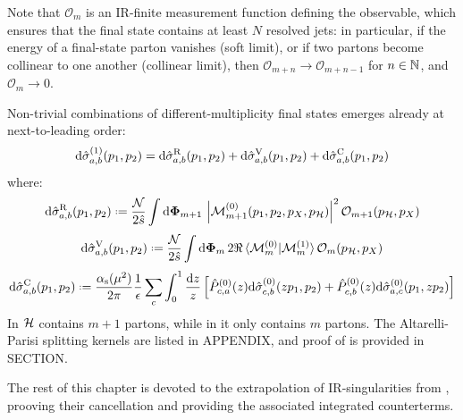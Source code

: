 Note that $ \mathcal{O}_m $ is an IR-finite measurement function defining the observable, which ensures that the final state contains at least $ N $ resolved jets: in particular, if the energy of a final-state parton vanishes (soft limit), or if two partons become collinear to one another (collinear limit), then $ \mathcal{O}_{m + n} \rightarrow \mathcal{O}_{m + n - 1} $ for $ n \in \mathbb{N} $, and $ \mathcal{O}_m \rightarrow 0 $.

Non-trivial combinations of different-multiplicity final states emerges already at next-to-leading order:
\begin{equation}
  \mathrm{d}\hat{\sigma}_{a,b}^{(1)}(p_1 , p_2) = \mathrm{d}\hat{\sigma}_{a,b}^\text{R}(p_1 , p_2) + \mathrm{d}\hat{\sigma}_{a,b}^\text{V}(p_1 , p_2) + \mathrm{d}\hat{\sigma}_{a,b}^\text{C}(p_1 , p_2)
\end{equation}
where:
\begin{equation}
  \dd\pcs_{a,b}^\text{R}(p_1 , p_2) \defeq \frac{\mathcal{N}}{2\hat{s}} \int \lps_{m+1} \, \abs{\mat^{(0)}_{m+1}(p_1, p_2, p_X, p_\fs)}^2 \mathcal{O}_{m+1}(p_\fs, p_X)
  \label{eq:real-cs}
\end{equation}
\begin{equation}
  \dd\pcs_{a,b}^\text{V}(p_1 , p_2) \defeq \frac{\mathcal{N}}{2\hat{s}} \int \lps_m \, 2\Re \braket{\mat_m^{(0)} | \mat_m^{(1)}} \mathcal{O}_m(p_\fs, p_X)
  \label{eq:virt-cs}
\end{equation}
\begin{equation}
  \dd\pcs_{a,b}^\text{C}(p_1 , p_2) \defeq \frac{\rcr}{2\pi} \frac{1}{\de} \sum_c \int_0^1 \frac{\dd z}{z} \left[ \hat{P}_{c,a}^{(0)}(z) \dd\pcs_{c,b}^{(0)}(z p_1 , p_2) + \hat{P}_{c,b}^{(0)}(z) \dd\pcs_{a,c}^{(0)}(p_1 , z p_2) \right]
  \label{eq:pdf-cs}
\end{equation}
In  $ \mathcal{H} $ contains $ m+1 $ partons, while in  it only contains $ m $ partons. The Altarelli-Parisi splitting kernels are listed in APPENDIX, and proof of  is provided in SECTION.

The rest of this chapter is devoted to the extrapolation of IR-singularities from , prooving their cancellation and providing the associated integrated counterterms.










